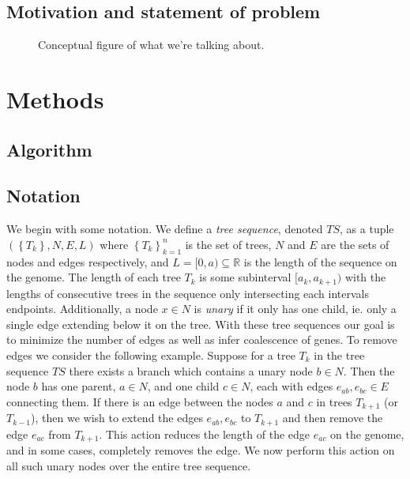\documentclass[10pt,twoside,lineno]{gsajnl}
\newcommand{\R}{\mathbb{R}}
\begin{document}
\subsection{Motivation and statement of problem}


\begin{figure}
    \caption{
        Conceptual figure of what we're talking about.
        \label{fig:conceptual}
    }
\end{figure}

\section{Methods}

\subsection{Algorithm}

 
\subsection*{Notation}
    We begin with some notation. We define a \textit{tree sequence}, denoted $TS$, 
    as a tuple $\left( \left\{T_k\right\}, N, E, L\right)$ where
     $\left\{T_k\right\}_{k=1}^n$ is the set of trees,
     $N$ and $E$ are the sets of nodes and edges respectively,
     and $L=[0,a)\subseteq \R$ is the length of the sequence on the genome.
     The length of each tree $T_k$ is some subinterval $[a_k,a_{k+1})$ 
     with the lengths of consecutive trees in the sequence 
     only intersecting each intervals endpoints. 
    Additionally, a node $x\in N$ is \textit{unary} if it only has one child, 
    ie. only a single edge extending below it on the tree.
    With these tree sequences our goal is to
    minimize the number of edges
    as well as infer coalescence of genes. 
    To remove edges we consider the following example.
    Suppose for a tree $T_k$ in the tree sequence $TS$ 
    there exists a branch which contains a unary node $b\in N$.
    Then the node $b$ has one parent, $a\in N$, 
    and one child $c\in N$,
    each with edges $e_{ab}, e_{bc}\in E$ connecting them.
    If there is an edge between the nodes $a$ and $c$ in trees 
    $T_{k+1}$ (or $T_{k-1}$),
    then we wish to extend the edges $e_{ab},e_{bc}$ 
    to $T_{k+1}$ and then remove the edge $e_{ac}$ from $T_{k+1}$. 
    This action reduces the length of the edge $e_{ac}$ on the genome,
    and in some cases, completely removes the edge. 
    We now perform this action on all such unary nodes 
    over the entire tree sequence.
\end{document}
